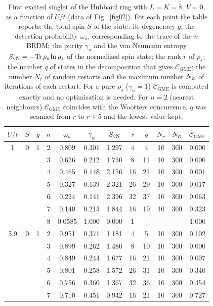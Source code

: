 \documentclass[12pt]{article}
\begin{document}
\begin{table}
\caption{First excited singlet of the Hubbard ring with $L=K=8$, $V=0$, as a function of $U/t$ (data of Fig.~\ref{fig02}). For each point the table reports: the total spin $S$ of the state; its degeneracy $g$; the detection probability $\omega_n$, corresponding to the trace of the $n$BRDM; the purity $\gamma_n$ and the von Neumann entropy $S_{\rm vN}=-\mathrm{Tr}\,\rho_s\ln\rho_s$ of the normalized spin state; the rank $r$ of $\rho_s$; the number $q$ of states in the decomposition that gives $\mathcal{C}_{\mathrm{GME}}$; the number $N_r$ of random restarts and the maximum number $N_{\rm it}$ of iterations of each restart. For a pure $\rho_s$ ($\gamma_n=1$) $\mathcal{C}_{\mathrm{GME}}$ is computed exactly and no optimisation is needed. For $n=2$ (nearest neighbours) $\mathcal{C}_{\mathrm{GME}}$ coincides with the Wootters concurrence. $q$ was scanned from $r$ to $r+5$ and the lowest value kept.}
\label{tab:uscan_es_L8}
\begin{ruledtabular}
\begin{tabular}{cccccccccccc}
$U/t$ & $S$ & $g$ & $n$ & $\omega_n$ & $\gamma_n$ & $S_{\rm vN}$ & $r$ & $q$ & $N_r$ & $N_{\rm it}$ & $\mathcal{C}_{\mathrm{GME}}$ \\
\hline
1 & 0 & 1 & 2 & 0.809 & 0.301 & 1.297 & 4 & 4 & 10 & 300 & 0.000 \\
 & &  & 3 & 0.626 & 0.212 & 1.730 & 8 & 11 & 10 & 300 & 0.000 \\
 & &  & 4 & 0.465 & 0.148 & 2.156 & 16 & 21 & 10 & 300 & 0.001 \\
 & &  & 5 & 0.327 & 0.139 & 2.321 & 26 & 29 & 10 & 300 & 0.017 \\
 & &  & 6 & 0.224 & 0.141 & 2.396 & 32 & 37 & 10 & 300 & 0.063 \\
 & &  & 7 & 0.140 & 0.215 & 1.844 & 16 & 19 & 10 & 300 & 0.323 \\
 & &  & 8 & 0.0585 & 1.000 & 0.000 & 1 & -- & -- & -- & 1.000 \\
\hline
5.9 & 0 & 1 & 2 & 0.951 & 0.371 & 1.181 & 4 & 5 & 10 & 300 & 0.102 \\
 & &  & 3 & 0.899 & 0.262 & 1.480 & 8 & 10 & 10 & 300 & 0.000 \\
 & &  & 4 & 0.849 & 0.244 & 1.677 & 16 & 21 & 10 & 300 & 0.007 \\
 & &  & 5 & 0.801 & 0.258 & 1.572 & 26 & 31 & 10 & 300 & 0.340 \\
 & &  & 6 & 0.756 & 0.360 & 1.367 & 32 & 36 & 10 & 300 & 0.454 \\
 & &  & 7 & 0.710 & 0.451 & 0.942 & 16 & 21 & 10 & 300 & 0.727 \\

\end{tabular}
\end{ruledtabular}
\end{table}
\end{document}

